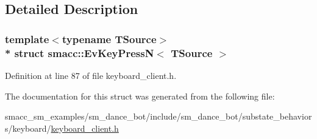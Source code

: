 \subsection{Detailed Description}
\subsubsection*{template$<$typename T\+Source$>$\\*
struct smacc\+::\+Ev\+Key\+Press\+N$<$ T\+Source $>$}



Definition at line 87 of file keyboard\+\_\+client.\+h.



The documentation for this struct was generated from the following file\+:\begin{DoxyCompactItemize}
\item 
smacc\+\_\+sm\+\_\+examples/sm\+\_\+dance\+\_\+bot/include/sm\+\_\+dance\+\_\+bot/substate\+\_\+behaviors/keyboard/\hyperlink{keyboard__client_8h}{keyboard\+\_\+client.\+h}\end{DoxyCompactItemize}

